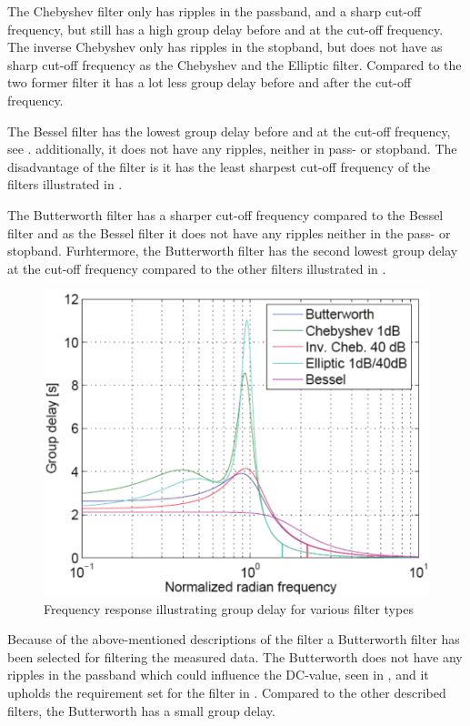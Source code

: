 The Chebyshev filter only has ripples in the passband, and a sharp cut-off frequency, but still has a high group delay before and at the cut-off frequency. The inverse Chebyshev only has ripples in the stopband, but does not have as sharp cut-off frequency as the Chebyshev and the Elliptic filter. Compared to the two former filter it has a lot less group delay before and after the cut-off frequency.

The Bessel filter has the lowest group delay before and at the cut-off frequency, see . additionally, it does not have any ripples, neither in pass- or stopband. The disadvantage of the filter is it has the least sharpest cut-off frequency of the filters illustrated in .

The Butterworth filter has a sharper cut-off frequency compared to the Bessel filter and as the Bessel filter it does not have any ripples neither in the pass- or stopband. Furhtermore, the Butterworth filter has the second lowest group delay at the cut-off frequency compared to the other filters illustrated in . 

\begin{figure}[H]
	\centering
	\includegraphics[scale=0.7]{figures/Filtertypes2.pdf}
	\caption{Frequency response illustrating group delay for various filter types}
	\label{fig:groupdelay}
\end{figure}

Because of the above-mentioned descriptions of the filter a Butterworth filter has been selected for filtering the measured data. The Butterworth does not have any ripples in the passband which could influence the DC-value, seen in , and it upholds the requirement set for the filter in . Compared to the other described filters, the Butterworth has a small group delay.

